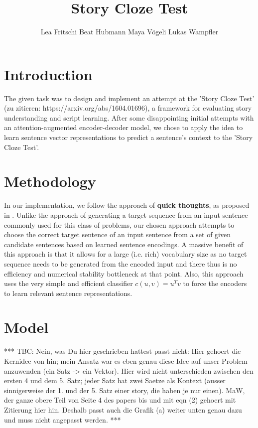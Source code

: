 \documentclass{article}
\title{Story Cloze Test}
\author{Lea Fritschi \qquad Beat Hubmann \qquad  Maya V\"ogeli \qquad   Lukas Wampfler}
\begin{document}

\maketitle


\section{Introduction}
The given task was to design and implement an attempt at the 'Story Cloze Test' (zu zitieren: https://arxiv.org/abs/1604.01696), a framework for evaluating story understanding and script learning.
After some disappointing initial attempts with an attention-augmented encoder-decoder model, we chose to apply the idea to learn sentence vector representations to predict a sentence's context  \cite{eff_framework} to the 'Story Cloze Test'.


\section{Methodology}

In our implementation, we follow the approach of {\bf quick thoughts}, as proposed in \cite{eff_framework}. Unlike the approach of generating a target sequence from an input sentence commonly used for this class of problems, our chosen approach attempts to choose the correct target sentence of an input sentence from a set of given candidate sentences based on learned sentence encodings. A massive benefit of this approach is that it allows for a large (i.e. rich) vocabulary size as no target sequence needs to be generated from the encoded input and there thus is no efficiency and numerical stability bottleneck at that point. Also, this approach uses the very simple and efficient classifier $c(u, v) = u^{T}v$ to force the encoders to learn relevant sentence representations.

\section{Model}

*** TBC: Nein, was Du hier geschrieben hattest passt nicht: Hier gehoert die Kernidee von \cite{eff_framework} hin; mein Ansatz war es eben genau diese Idee auf unser Problem anzuwenden (ein Satz -> ein Vektor). Hier wird nicht unterschieden zwischen den ersten 4 und dem 5. Satz; jeder Satz hat zwei Saetze als Kontext (ausser sinnigerweise der 1. und der 5. Satz einer story, die haben je nur einen). MaW, der ganze obere Teil von Seite 4 des papers bis und mit eqn (2) gehoert mit Zitierung hier hin. Deshalb passt auch die Grafik (a) weiter unten genau dazu und muss nicht angepasst werden. ***
\end{document}
